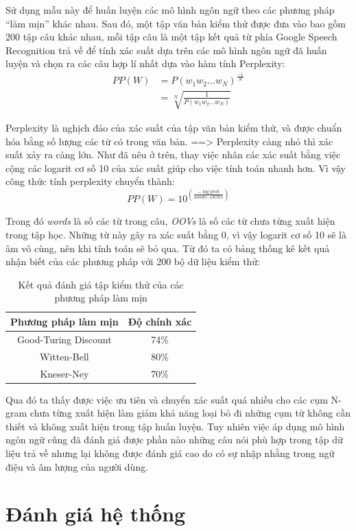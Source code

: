 \documentclass[12pt]{report}
\begin{document}
Sử dụng mẫu này để huấn luyện các mô hình ngôn ngữ theo các phương pháp ``làm mịn'' khác nhau. Sau đó, một tập văn bản kiểm thử được đưa vào bao gồm 200 tập câu khác nhau, mỗi tập câu là một tập kết quả từ phía Google Speech Recognition trả về để tính xác suất dựa trên các mô hình ngôn ngữ đã huấn luyện và chọn ra các câu hợp lí nhất dựa vào hàm tính Perplexity:
\begin{align*}
PP(W) &= P(w_1w_2 \ldots w_N)^{\frac{-1}{N}} \\
	&= \sqrt[N]{\frac{1}{P(w_1w_2 \ldots w_N)}}
\end{align*}

Perplexity là nghịch đảo của xác suất của tập văn bản kiểm thử, và được chuẩn hóa bằng số lượng các từ có trong văn bản.
==> Perplexity càng nhỏ thì xác suất xảy ra càng lớn. Như đã nêu ở trên, thay việc nhân các xác suất bằng việc cộng các logarit cơ số 10 của xác suất giúp cho việc tính toán nhanh hơn. Vì vậy công thức tính perplexity chuyển thành:
\[PP(W) = 10^{(\frac{-\log\textit{prob}}{\textit{words} - \textit{OOVs}})}\]

Trong đó \textit{words} là số các từ trong câu, \textit{OOVs} là số các từ chưa từng xuất hiện trong tập học. Những từ này gây ra xác suất bằng 0, vì vậy logarit cơ số 10 sẽ là âm vô cùng, nên khi tính toán sẽ bỏ qua. Từ đó ta có bảng thống kê kết quả nhận biết của các phương pháp với 200 bộ dữ liệu kiểm thử:
\begin{table}[h]
	\caption{Kết quả đánh giá tập kiểm thử của các phương pháp làm mịn}
	\centering
	\begin{tabular}{ | c | c | }
	\hline
	Phương pháp làm mịn & Độ chính xác \\
	\hline
	Good-Turing Discount & 74\% \\
	\hline
	Witten-Bell & 80\% \\
	\hline
	Kneser-Ney & 70\% \\
	\hline
	\end{tabular}
\end{table}

Qua đó ta thấy được việc ưu tiên và chuyển xác suất quá nhiều cho các cụm N-gram chưa từng xuất hiện làm giảm khả năng loại bỏ đi những cụm từ không cần thiết và không xuất hiện trong tập huấn luyện. Tuy nhiên việc áp dụng mô hình ngôn ngữ cũng đã đánh giá được phần nào những câu nói phù hợp trong tập dữ liệu trả về nhưng lại không được đánh giá cao do có sự nhập nhằng trong ngữ điệu và âm lượng của người dùng. 

\section{Đánh giá hệ thống}
\end{document}
